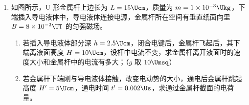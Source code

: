 \documentclass[\gkver]{gaokaozhenti}
\begin{document}
\begin{enumerate}
{	$T = (27 + 273) \UK = 300 \UK$，$T' = (37 + 273) \UK = 310 \UK$

	温度变化过程中体积不变，故由查理定律有 $\frac{p}{T} = \frac{p'}{T'}$

	解得 $p' = 1.085 \times 10^{5} \UPa$

	（2）保持温度不变，挤压气体，等温变化过程，由玻意耳定律有

	$pV = p'V'$

	解得 $V' \approx 0.97V$
}

\item
如图所示，U 形金属杆上边长为 $L = 15 \Ucm$，质量为 $m = 1 \times 10^{-3} \Ukg$，下端插入导电液体中，导电液体连接电源，金属杆所在空间有垂直纸面向里 $B = 8 \times 10^{-2} \UT$ 的匀强磁场。
\begin{enumerate}
	\item
	若插入导电液体部分深 $h = 2.5 \Ucm$，闭合电键后，金属杆飞起后，其下端离液面高度 $H = 10 \Ucm$，设杆中电流不变，求金属杆离开液面时的速度大小和金属杆中的电流有多大；（$g$ 取 $10 \Umsq$）
	\item
	若金属杆下端刚与导电液体接触，改变电动势的大小，通电后金属杆跳起高度 $H' = 5 \Ucm$，通电时间 $t' = 0.002 \Us$，求通过金属杆截面的电荷量。
\end{enumerate}


\end{enumerate}
\end{document}

